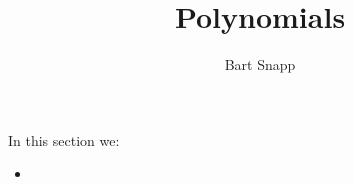 \documentclass{ximera}
\author{Bart Snapp}
\title{Polynomials}
\begin{document}
\begin{abstract}
\end{abstract}
\maketitle
In this section we:

\begin{itemize}
\item 
\end{itemize}
\end{document}
